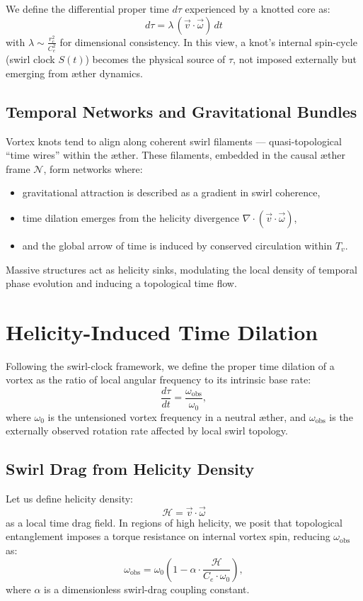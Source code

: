 We define the differential proper time \( d\tau \) experienced by a knotted core as:
\[
    \boxed{
    d\tau = \lambda \, (\vec{v} \cdot \vec{\omega}) \, dt
    }
\]
with \( \lambda \sim \frac{r_c^2}{C_e^2} \) for dimensional consistency. In this view, a knot's internal spin-cycle (swirl clock \( S(t) \)) becomes the physical source of \( \tau \), not imposed externally but emerging from æther dynamics.

\subsection*{Temporal Networks and Gravitational Bundles}

Vortex knots tend to align along coherent swirl filaments — quasi-topological “time wires” within the æther. These filaments, embedded in the causal æther frame \( \mathcal{N} \), form networks where:
\begin{itemize}
  \item gravitational attraction is described as a gradient in swirl coherence,
  \item time dilation emerges from the helicity divergence \( \nabla \cdot (\vec{v} \cdot \vec{\omega}) \),
  \item and the global arrow of time is induced by conserved circulation within \( T_v \).
\end{itemize}

Massive structures act as helicity sinks, modulating the local density of temporal phase evolution and inducing a topological time flow.

\section{Helicity-Induced Time Dilation}

Following the swirl-clock framework, we define the proper time dilation of a vortex as the ratio of local angular frequency to its intrinsic base rate:
\[
    \frac{d\tau}{dt} = \frac{\omega_{\text{obs}}}{\omega_0},
\]
where \( \omega_0 \) is the untensioned vortex frequency in a neutral æther, and \( \omega_{\text{obs}} \) is the externally observed rotation rate affected by local swirl topology.

\subsection*{Swirl Drag from Helicity Density}

Let us define helicity density:
\[
    \mathcal{H} = \vec{v} \cdot \vec{\omega}
\]
as a local time drag field. In regions of high helicity, we posit that topological entanglement imposes a torque resistance on internal vortex spin, reducing \( \omega_{\text{obs}} \) as:
\[
    \omega_{\text{obs}} = \omega_0 \left( 1 - \alpha \cdot \frac{\mathcal{H}}{C_e \cdot \omega_0} \right),
\]
where \( \alpha \) is a dimensionless swirl-drag coupling constant.

